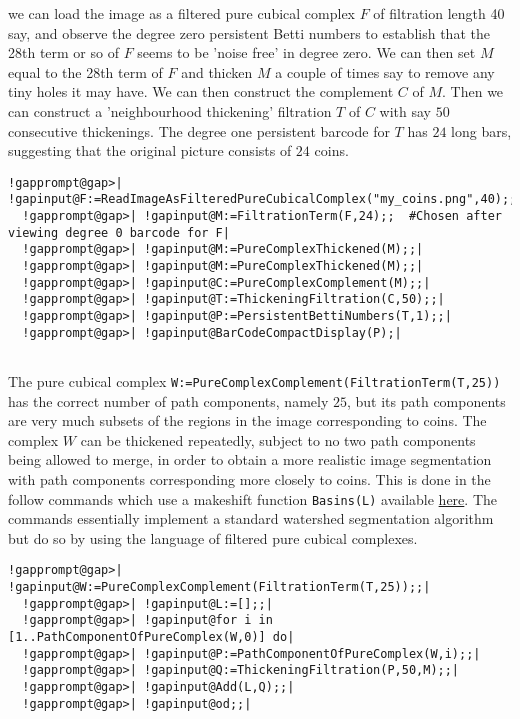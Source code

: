 \documentclass[a4paper,11pt]{report}
\begin{document}
{{ we can load the image as a filtered pure cubical complex $F$ of filtration length 40 say, and observe the degree zero persistent Betti
numbers to establish that the 28\texttt{}th term or so of $F$ seems to be 'noise free' in degree zero. We can then set $M$ equal to the 28\texttt{}th term of $F$ and thicken $M$ a couple of times say to remove any tiny holes it may have. We can then
construct the complement $C$ of $M$. Then we can construct a 'neighbourhood thickening' filtration $T$ of $C$ with say $50$ consecutive thickenings. The degree one persistent barcode for $T$ has $24$ long bars, suggesting that the original picture consists of $24$ coins. 
\begin{Verbatim}[commandchars=!@|,fontsize=\small,frame=single,label=Example]
  !gapprompt@gap>| !gapinput@F:=ReadImageAsFilteredPureCubicalComplex("my_coins.png",40);;|
  !gapprompt@gap>| !gapinput@M:=FiltrationTerm(F,24);;  #Chosen after viewing degree 0 barcode for F|
  !gapprompt@gap>| !gapinput@M:=PureComplexThickened(M);;|
  !gapprompt@gap>| !gapinput@M:=PureComplexThickened(M);;|
  !gapprompt@gap>| !gapinput@C:=PureComplexComplement(M);;|
  !gapprompt@gap>| !gapinput@T:=ThickeningFiltration(C,50);;|
  !gapprompt@gap>| !gapinput@P:=PersistentBettiNumbers(T,1);;|
  !gapprompt@gap>| !gapinput@BarCodeCompactDisplay(P);|
  
\end{Verbatim}
 

  

 The pure cubical complex \texttt{W:=PureComplexComplement(FiltrationTerm(T,25))} has the correct number of path components, namely $25$, but its path components are very much subsets of the regions in the image
corresponding to coins. The complex $W$ can be thickened repeatedly, subject to no two path components being allowed
to merge, in order to obtain a more realistic image segmentation with path
components corresponding more closely to coins. This is done in the follow
commands which use a makeshift function \texttt{Basins(L)} available \href{tutex/basins.g} {here}. The commands essentially implement a standard watershed segmentation
algorithm but do so by using the language of filtered pure cubical complexes. 
\begin{Verbatim}[commandchars=!@|,fontsize=\small,frame=single,label=Example]
  !gapprompt@gap>| !gapinput@W:=PureComplexComplement(FiltrationTerm(T,25));;|
  !gapprompt@gap>| !gapinput@L:=[];;|
  !gapprompt@gap>| !gapinput@for i in [1..PathComponentOfPureComplex(W,0)] do|
  !gapprompt@gap>| !gapinput@P:=PathComponentOfPureComplex(W,i);;|
  !gapprompt@gap>| !gapinput@Q:=ThickeningFiltration(P,50,M);;|
  !gapprompt@gap>| !gapinput@Add(L,Q);;|
  !gapprompt@gap>| !gapinput@od;;|
  

\end{Verbatim}}}
\end{document}
